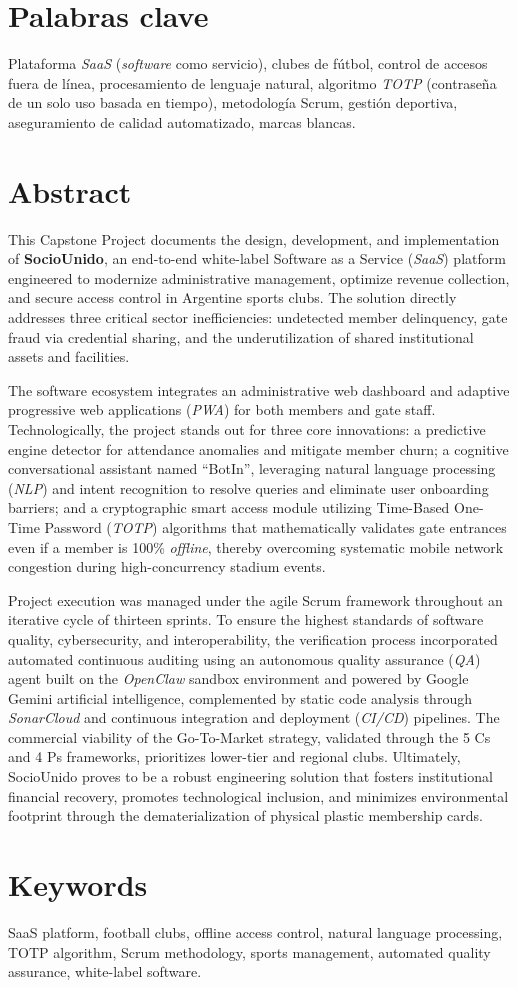 \section{Palabras clave}

Plataforma \textit{SaaS} (\textit{software} como servicio), clubes de fútbol, control de accesos fuera de línea, procesamiento de lenguaje natural, algoritmo \textit{TOTP} (contraseña de un solo uso basada en tiempo), metodología Scrum, gestión deportiva, aseguramiento de calidad automatizado, marcas blancas.

\newpage

\section{Abstract}

This Capstone Project documents the design, development, and implementation of \textbf{SocioUnido}, an end-to-end white-label Software as a Service (\textit{SaaS}) platform engineered to modernize administrative management, optimize revenue collection, and secure access control in Argentine sports clubs. The solution directly addresses three critical sector inefficiencies: undetected member delinquency, gate fraud via credential sharing, and the underutilization of shared institutional assets and facilities.

The software ecosystem integrates an administrative web dashboard and adaptive progressive web applications (\textit{PWA}) for both members and gate staff. Technologically, the project stands out for three core innovations: a predictive engine detector for attendance anomalies and mitigate member churn; a cognitive conversational assistant named ``BotIn'', leveraging natural language processing (\textit{NLP}) and intent recognition to resolve queries and eliminate user onboarding barriers; and a cryptographic smart access module utilizing Time-Based One-Time Password (\textit{TOTP}) algorithms that mathematically validates gate entrances even if a member is 100\% \textit{offline}, thereby overcoming systematic mobile network congestion during high-concurrency stadium events.

Project execution was managed under the agile Scrum framework throughout an iterative cycle of thirteen sprints. To ensure the highest standards of software quality, cybersecurity, and interoperability, the verification process incorporated automated continuous auditing using an autonomous quality assurance (\textit{QA}) agent built on the \textit{OpenClaw} sandbox environment and powered by Google Gemini artificial intelligence, complemented by static code analysis through \textit{SonarCloud} and continuous integration and deployment (\textit{CI/CD}) pipelines. The commercial viability of the Go-To-Market strategy, validated through the 5 Cs and 4 Ps frameworks, prioritizes lower-tier and regional clubs. Ultimately, SocioUnido proves to be a robust engineering solution that fosters institutional financial recovery, promotes technological inclusion, and minimizes environmental footprint through the dematerialization of physical plastic membership cards.

\section{Keywords}

SaaS platform, football clubs, offline access control, natural language processing, TOTP algorithm, Scrum methodology, sports management, automated quality assurance, white-label software.